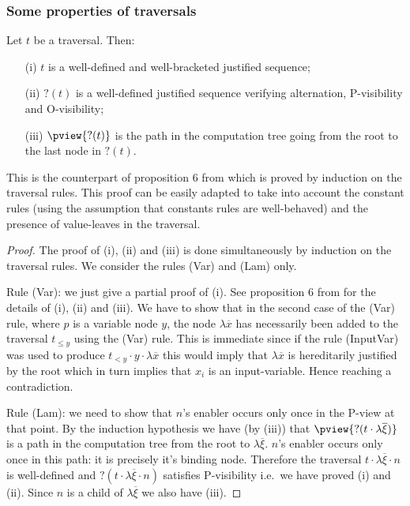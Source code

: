 \subsubsection{Some properties of traversals}

\begin{proposition}
\label{prop:pviewtrav_is_path}
Let $t$ be a traversal. Then:
\begin{itemize}
\item[(i)] $t$ is a well-defined and well-bracketed justified sequence;
\item[(ii)] $?(t)$ is a well-defined justified sequence verifying alternation, P-visibility and O-visibility;
\item[(iii)] $\pview{?(t)}$ is the path in the computation tree going from the root to the last node in $?(t)$.
\end{itemize}
\end{proposition}

This is the counterpart of proposition 6 from
\cite{OngHoMchecking2006} which is proved by induction on the
traversal rules. This proof can be easily adapted to take into
account the constant rules (using the assumption that constants
rules are well-behaved) and the presence of value-leaves in the
traversal.
\begin{proof}
The proof of (i), (ii) and (iii) is done simultaneously by induction on the traversal rules. We consider the rules (Var) and (Lam) only.

Rule (Var): we just give a partial proof of (i). See proposition 6 from \cite{OngHoMchecking2006} for the details of (i), (ii) and (iii). We have to show that in the second case of the (Var) rule, where $p$ is a variable node $y$, the node $\lambda \overline{x}$ has necessarily been added to the traversal $t_{\leq y}$ using the (Var) rule. This is immediate since if the rule (InputVar) was used to produce $t_{<y} \cdot y \cdot \lambda \overline{x}$ this would imply that $\lambda \overline{x}$ is hereditarily justified by the root which in turn implies that $x_i$ is an input-variable. Hence reaching a contradiction.

Rule (Lam): we need to show that $n$'s enabler occurs only once in the P-view at that point. By the induction hypothesis we have (by (iii)) that $\pview{?(t \cdot \lambda \overline{\xi})}$ is a path in the computation tree from the root to $\lambda \overline{\xi}$. $n$'s enabler occurs only once in this path: it is precisely it's binding node. Therefore the traversal $t \cdot \lambda \overline{\xi} \cdot n$ is well-defined and $?(t \cdot \lambda \overline{\xi} \cdot n)$ satisfies P-visibility i.e.\ we have proved (i) and (ii). Since $n$ is a child of $\lambda \overline{\xi}$ we also have (iii).
\end{proof}


